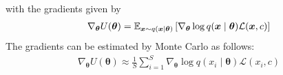 \begin{itemize}
with the gradients given by
\begin{align}\label{eq:grad_estimator}
\nabla_{\boldsymbol{\theta}} U(\boldsymbol{\theta}) =\mathbb{E}_{\boldsymbol{x} \sim q(\boldsymbol{x} \mid \boldsymbol{\theta})}\left[\nabla_{\boldsymbol{\theta}} \log q(\boldsymbol{x} \mid \boldsymbol{\theta}) \mathcal{L}(\boldsymbol{x},c)\right]
\end{align}
%
The gradients can be estimated by Monte Carlo as follows:
\begin{align}\label{eq:VO_grad_estimator}
\nabla_{\boldsymbol{\theta}} U(\boldsymbol{\theta}) \approx 
\frac{1}{S} \sum_{i=1}^{S}
\nabla_{\boldsymbol{\theta}} \log q(x_i \mid \boldsymbol{\theta}) \mathcal{L}(x_i,c)
\end{align}


\end{itemize}
